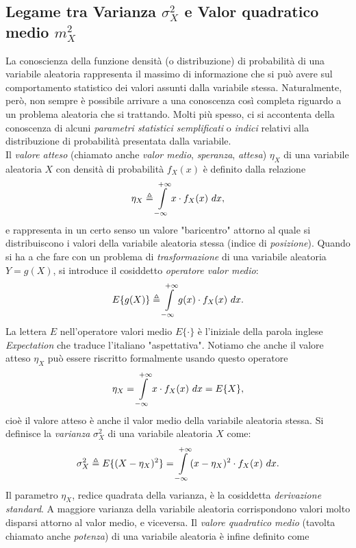 \documentclass[12pt,oneside,openany]{memoir}
\numberwithin{equation}{subsection}
\begin{document}
\subsection{Legame tra Varianza $\sigma_X^2$ e Valor quadratico medio $m_X^2$}
La conoscienza della funzione densit\`a (o distribuzione) di probabilit\`a di
una variabile aleatoria rappresenta il massimo di informazione che si pu\`o
avere sul comportamento statistico dei valori assunti dalla variabile stessa.
Naturalmente, per\`o, non sempre \`e possibile arrivare a una conoscenza cos\`i
completa riguardo a un problema aleatoria che si trattando. Molti pi\`u spesso,
ci si accontenta della conoscenza di alcuni \textit{parametri statistici
semplificati} o \textit{indici} relativi alla distribuzione di probabilit\`a
presentata dalla variabile.\\
Il \textit{valore atteso} (chiamato anche \textit{valor medio},
\textit{speranza}, \textit{attesa}) $\eta_X$ di una variabile aleatoria $X$
con densit\`a di probabilit\`a $f_X(x)$ \`e definito dalla relazione
\[
    \eta_X \triangleq \int\displaylimits_{-\infty}^{+\infty} x \cdot f_X(x)
    \ dx,
\]
e rappresenta in un certo senso un valore "baricentro" attorno al quale si
distribuiscono i valori della variabile aleatoria stessa (indice di
\textit{posizione}).
\bigbreak
Quando si ha a che fare con un problema di \textit{trasformazione} di una
variabile aleatoria $Y = g(X)$, si introduce il cosiddetto \textit{operatore
valor medio}:
\[
    E\{g(X)\} \triangleq \int\displaylimits_{-\infty}^{+\infty} g(x) \cdot
    f_X(x) \ dx.
\]
La lettera $E$ nell'operatore valori medio $E\{\cdot\}$ \`e l'iniziale della
parola inglese \textit{Expectation} che traduce l'italiano "aspettativa".
Notiamo che anche il valore atteso $\eta_X$ pu\`o essere riscritto formalmente
usando questo operatore
\[
    \eta_X = \int\displaylimits_{-\infty}^{+\infty} x \cdot f_X(x) \ dx = E\{X\},
\]
cio\`e il valore atteso \`e anche il valor medio della variabile aleatoria
stessa.
\bigbreak
Si definisce la \textit{varianza} $\sigma_X^2$ di una variabile aleatoria $X$
come:
\[
    \sigma_X^2 \triangleq E\{(X - \eta_X)^2\} =
    \int\displaylimits_{-\infty}^{+\infty} (x - \eta_X)^2 \cdot f_X(x) \ dx.
\]
Il parametro $\eta_X$, redice quadrata della varianza, \`e la cosiddetta
\textit{derivazione standard}. A maggiore varianza della variabile aleatoria
corrispondono valori molto disparsi attorno al valor medio, e viceversa.
\bigbreak
Il \textit{valore quadratico medio} (tavolta chiamato anche \textit{potenza}) di
una variabile aleatoria \`e infine definito come
\end{document}
